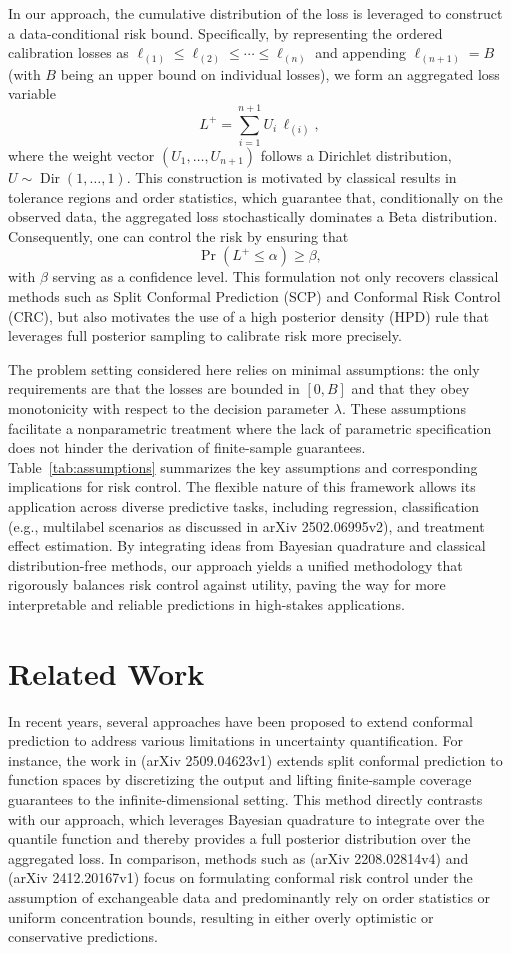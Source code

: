 \documentclass{article}
\begin{document}
In our approach, the cumulative distribution of the loss is leveraged to construct a data-conditional risk bound. Specifically, by representing the ordered calibration losses as $\ell_{(1)} \leq \ell_{(2)} \leq \cdots \leq \ell_{(n)}$ and appending $\ell_{(n+1)} = B$ (with $B$ being an upper bound on individual losses), we form an aggregated loss variable
\[
L^+ = \sum_{i=1}^{n+1} U_i \, \ell_{(i)},
\]
where the weight vector $(U_1,\ldots,U_{n+1})$ follows a Dirichlet distribution, $U \sim \operatorname{Dir}(1, \dots, 1)$. This construction is motivated by classical results in tolerance regions and order statistics, which guarantee that, conditionally on the observed data, the aggregated loss stochastically dominates a Beta distribution. Consequently, one can control the risk by ensuring that
\[
\Pr(L^+ \leq \alpha) \geq \beta,
\]
with $\beta$ serving as a confidence level. This formulation not only recovers classical methods such as Split Conformal Prediction (SCP) and Conformal Risk Control (CRC), but also motivates the use of a high posterior density (HPD) rule that leverages full posterior sampling to calibrate risk more precisely.

The problem setting considered here relies on minimal assumptions: the only requirements are that the losses are bounded in $[0,B]$ and that they obey monotonicity with respect to the decision parameter $\lambda$. These assumptions facilitate a nonparametric treatment where the lack of parametric specification does not hinder the derivation of finite-sample guarantees. Table~\ref{tab:assumptions} summarizes the key assumptions and corresponding implications for risk control. The flexible nature of this framework allows its application across diverse predictive tasks, including regression, classification (e.g., multilabel scenarios as discussed in arXiv 2502.06995v2), and treatment effect estimation. By integrating ideas from Bayesian quadrature and classical distribution-free methods, our approach yields a unified methodology that rigorously balances risk control against utility, paving the way for more interpretable and reliable predictions in high-stakes applications.

\section{Related Work}
In recent years, several approaches have been proposed to extend conformal prediction to address various limitations in uncertainty quantification. For instance, the work in (arXiv 2509.04623v1) extends split conformal prediction to function spaces by discretizing the output and lifting finite-sample coverage guarantees to the infinite-dimensional setting. This method directly contrasts with our approach, which leverages Bayesian quadrature to integrate over the quantile function and thereby provides a full posterior distribution over the aggregated loss. In comparison, methods such as (arXiv 2208.02814v4) and (arXiv 2412.20167v1) focus on formulating conformal risk control under the assumption of exchangeable data and predominantly rely on order statistics or uniform concentration bounds, resulting in either overly optimistic or conservative predictions.
\end{document}
